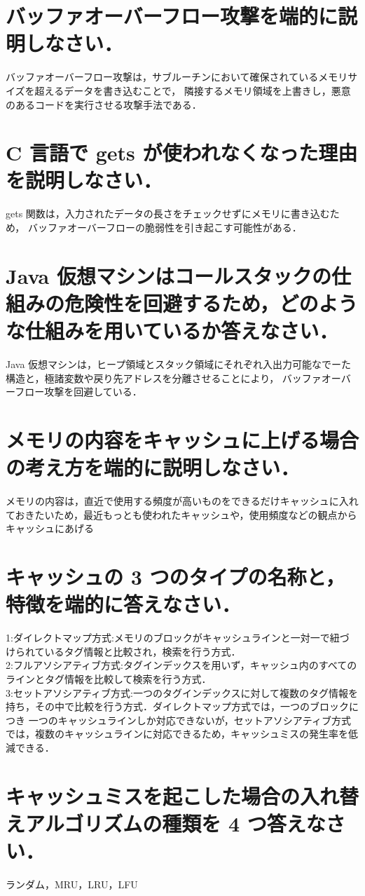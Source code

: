 \documentclass[a4paper,11pt]{ltjsarticle}
\begin{document}
\section{バッファオーバーフロー攻撃を端的に説明しなさい．}
バッファオーバーフロー攻撃は，サブルーチンにおいて確保されているメモリサイズを超えるデータを書き込むことで，
隣接するメモリ領域を上書きし，悪意のあるコードを実行させる攻撃手法である．
\section{C ⾔語で gets が使われなくなった理由を説明しなさい．}
gets 関数は，入力されたデータの長さをチェックせずにメモリに書き込むため，
バッファオーバーフローの脆弱性を引き起こす可能性がある．
\section{Java 仮想マシンはコールスタックの仕組みの危険性を回避するため，どのような仕組みを⽤いているか答えなさい．}
Java 仮想マシンは，ヒープ領域とスタック領域にそれぞれ入出力可能なでーた構造と，極諸変数や戻り先アドレスを分離させることにより，
バッファオーバーフロー攻撃を回避している．
\section{メモリの内容をキャッシュに上げる場合の考え⽅を端的に説明しなさい．}
メモリの内容は，直近で使用する頻度が高いものをできるだけキャッシュに入れておきたいため，最近もっとも使われたキャッシュや，使用頻度などの観点からキャッシュにあげる
\section{キャッシュの 3 つのタイプの名称と，特徴を端的に答えなさい．}
1:ダイレクトマップ方式:メモリのブロックがキャッシュラインと一対一で紐づけられているタグ情報と比較され，検索を行う方式．\\
2:フルアソシアティブ方式:タグインデックスを用いず，キャッシュ内のすべてのラインとタグ情報を比較して検索を行う方式．\\
3:セットアソシアティブ方式:一つのタグインデックスに対して複数のタグ情報を持ち，その中で比較を行う方式．ダイレクトマップ方式では，一つのブロックにつき
一つのキャッシュラインしか対応できないが，セットアソシアティブ方式では，複数のキャッシュラインに対応できるため，キャッシュミスの発生率を低減できる．
\section{キャッシュミスを起こした場合の⼊れ替えアルゴリズムの種類を 4 つ答えなさい．}
ランダム，MRU，LRU，LFU
\end{document}
